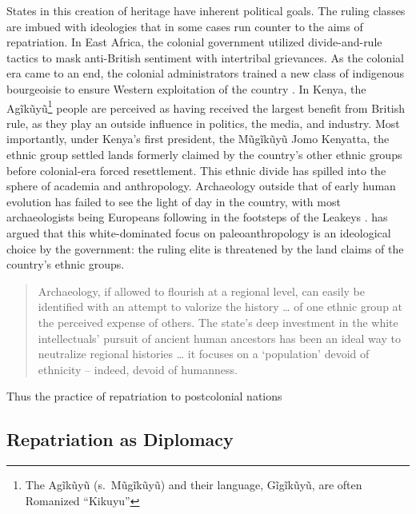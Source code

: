 \documentclass{../../../coursework}
\begin{document}
States in this creation of heritage have inherent political goals. The ruling
classes are imbued with ideologies that in some cases run counter to the aims
of repatriation. In East Africa, the colonial government utilized
divide-and-rule tactics to mask anti-British sentiment with intertribal
grievances. As the colonial era came to an end, the colonial administrators
trained a new class of indigenous bourgeoisie to ensure Western exploitation
of the country \parencite{Mut79}. In Kenya, the Agĩkũyũ\footnote{The Agĩkũyũ
(s.\ Mũgĩkũyũ) and their language, Gĩgĩkũyũ, are often Romanized ``Kikuyu''}
people are perceived as having received the largest benefit from British rule,
as they play an outside influence in politics, the media, and industry. Most
importantly, under Kenya's first president, the Mũgĩkũyũ Jomo Kenyatta, the
ethnic group settled lands formerly claimed by the country's other ethnic
groups before colonial-era forced resettlement. This ethnic divide has spilled
into the sphere of academia and anthropology. Archaeology outside that of
early human evolution has failed to see the light of day in the country, with
most archaeologists being Europeans following in the footsteps of the Leakeys
\parencite{Kof97}. \textcite{Sch95} has argued that this white-dominated focus
on paleoanthropology is an ideological choice by the government: the ruling
elite is threatened by the land claims of the country's ethnic groups.

\begin{quote}
    Archaeology, if allowed to flourish at a regional level, can easily be
    identified with an attempt to valorize the history … of one ethnic group
    at the perceived expense of others. The state's deep investment in the
    white intellectuals' pursuit of ancient human ancestors has been an ideal
    way to neutralize regional histories … it focuses on a `population' devoid
    of ethnicity -- indeed, devoid of humanness.
    
    \parencite[128-129]{Sch95}
\end{quote}

Thus the practice of repatriation to postcolonial nations 

\subsection{Repatriation as Diplomacy}
\end{document}
